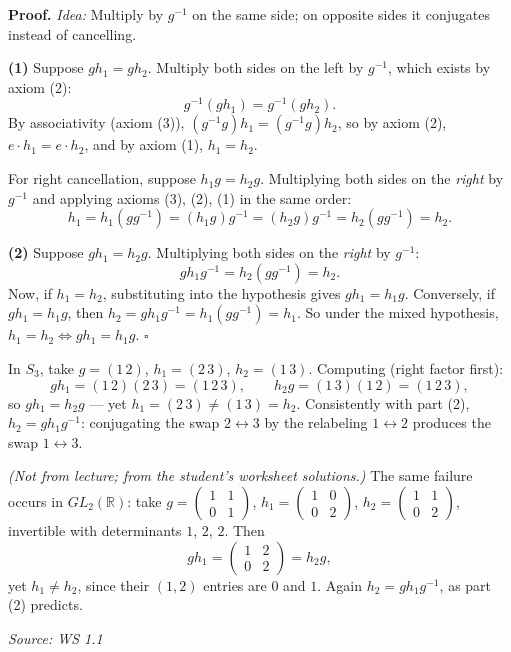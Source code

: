 \documentclass[11pt]{report}
\renewenvironment{proof}[1][Proof]{\noindent\textbf{#1.} }{\hfill$\square$\par\vspace{5pt}}
\newcommand{\srcline}[1]{\par\hfill{\footnotesize\textit{Source: #1}}}
\begin{document}
\begin{proof}
\textit{Idea:} Multiply by $g^{-1}$ on the same side; on opposite sides it conjugates instead of cancelling.\par
\textbf{(1)} Suppose $g h_1 = g h_2$. Multiply both sides on the left by $g^{-1}$, which exists by axiom (2):
\[ g^{-1} (g h_1) = g^{-1} (g h_2). \]
By associativity (axiom (3)), $(g^{-1} g) h_1 = (g^{-1} g) h_2$, so by axiom (2), $e \cdot h_1 = e \cdot h_2$, and by axiom (1), $h_1 = h_2$.

For right cancellation, suppose $h_1 g = h_2 g$. Multiplying both sides on the \emph{right} by $g^{-1}$ and applying axioms (3), (2), (1) in the same order:
\[ h_1 = h_1 (g g^{-1}) = (h_1 g) g^{-1} = (h_2 g) g^{-1} = h_2 (g g^{-1}) = h_2.
\]

\textbf{(2)} Suppose $g h_1 = h_2 g$. Multiplying both sides on the \emph{right} by $g^{-1}$:
\[ g h_1 g^{-1} = h_2 (g g^{-1}) = h_2. \]
Now, if $h_1 = h_2$, substituting into the hypothesis gives $g h_1 = h_1 g$. Conversely, if $g h_1 = h_1 g$, then $h_2 = g h_1 g^{-1} = h_1 (g g^{-1}) = h_1$. So under the mixed hypothesis, $h_1 = h_2 \iff g h_1 = h_1 g$.
\end{proof}

\begin{exbox}\label{ex:mixed-hypothesis-does-not-cancel}
In $S_3$, take $g = (1\,2)$, $h_1 = (2\,3)$, $h_2 = (1\,3)$. Computing (right factor first):
\[ g h_1 = (1\,2)(2\,3) = (1\,2\,3), \qquad h_2 g = (1\,3)(1\,2) = (1\,2\,3), \]
so $g h_1 = h_2 g$ --- yet $h_1 = (2\,3) \neq (1\,3) = h_2$. Consistently with part (2), $h_2 = g h_1 g^{-1}$: conjugating the swap $2 \leftrightarrow 3$ by the relabeling $1 \leftrightarrow 2$ produces the swap $1 \leftrightarrow 3$.

\textit{(Not from lecture; from the student's worksheet solutions.)} The same failure occurs in $GL_2(\mathbb{R})$: take $g = \begin{pmatrix} 1 & 1 \\ 0 & 1 \end{pmatrix}$, $h_1 = \begin{pmatrix} 1 & 0 \\ 0 & 2 \end{pmatrix}$, $h_2 = \begin{pmatrix} 1 & 1 \\ 0 & 2 \end{pmatrix}$, invertible with determinants $1$, $2$, $2$. Then \[ g h_1 = \begin{pmatrix} 1 & 2 \\ 0 & 2 \end{pmatrix} = h_2 g, \] yet $h_1 \neq h_2$, since their $(1,2)$ entries are $0$ and $1$. Again $h_2 = g h_1 g^{-1}$, as part (2) predicts.
\srcline{WS 1.1}
\end{exbox}
\end{document}
